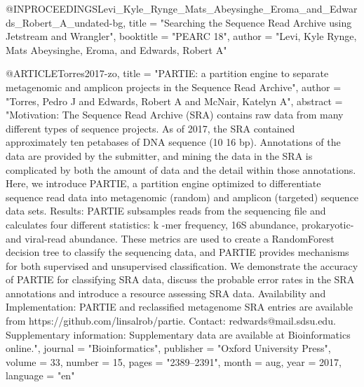 
@INPROCEEDINGS{Levi_Kyle_Rynge_Mats_Abeysinghe_Eroma_and_Edwards_Robert_A_undated-bg,
  title     = "Searching the Sequence Read Archive using Jetstream and Wrangler",
  booktitle = "{PEARC} 18",
  author    = "{Levi, Kyle Rynge, Mats Abeysinghe, Eroma, and Edwards, Robert
               A}"
}

@ARTICLE{Torres2017-zo,
  title     = "{PARTIE}: a partition engine to separate metagenomic and
               amplicon projects in the Sequence Read Archive",
  author    = "Torres, Pedro J and Edwards, Robert A and McNair, Katelyn A",
  abstract  = "Motivation: The Sequence Read Archive (SRA) contains raw data
               from many different types of sequence projects. As of 2017, the
               SRA contained approximately ten petabases of DNA sequence (10 16
               bp). Annotations of the data are provided by the submitter, and
               mining the data in the SRA is complicated by both the amount of
               data and the detail within those annotations. Here, we introduce
               PARTIE, a partition engine optimized to differentiate sequence
               read data into metagenomic (random) and amplicon (targeted)
               sequence data sets. Results: PARTIE subsamples reads from the
               sequencing file and calculates four different statistics: k -mer
               frequency, 16S abundance, prokaryotic- and viral-read abundance.
               These metrics are used to create a RandomForest decision tree to
               classify the sequencing data, and PARTIE provides mechanisms for
               both supervised and unsupervised classification. We demonstrate
               the accuracy of PARTIE for classifying SRA data, discuss the
               probable error rates in the SRA annotations and introduce a
               resource assessing SRA data. Availability and Implementation:
               PARTIE and reclassified metagenome SRA entries are available
               from https://github.com/linsalrob/partie. Contact:
               redwards@mail.sdsu.edu. Supplementary information: Supplementary
               data are available at Bioinformatics online.",
  journal   = "Bioinformatics",
  publisher = "Oxford University Press",
  volume    =  33,
  number    =  15,
  pages     = "2389--2391",
  month     =  aug,
  year      =  2017,
  language  = "en"
}

